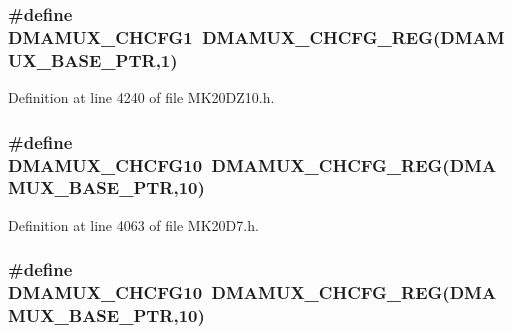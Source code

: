 \subsubsection[{\texorpdfstring{D\+M\+A\+M\+U\+X\+\_\+\+C\+H\+C\+F\+G1}{DMAMUX_CHCFG1}}]{\setlength{\rightskip}{0pt plus 5cm}\#define D\+M\+A\+M\+U\+X\+\_\+\+C\+H\+C\+F\+G1~{\bf D\+M\+A\+M\+U\+X\+\_\+\+C\+H\+C\+F\+G\+\_\+\+R\+EG}({\bf D\+M\+A\+M\+U\+X\+\_\+\+B\+A\+S\+E\+\_\+\+P\+TR},1)}\hypertarget{group___d_m_a_m_u_x___register___accessor___macros_gade1efccfbb28dfd338600665129d4b99}{}\label{group___d_m_a_m_u_x___register___accessor___macros_gade1efccfbb28dfd338600665129d4b99}


Definition at line 4240 of file M\+K20\+D\+Z10.\+h.

\subsubsection[{\texorpdfstring{D\+M\+A\+M\+U\+X\+\_\+\+C\+H\+C\+F\+G10}{DMAMUX_CHCFG10}}]{\setlength{\rightskip}{0pt plus 5cm}\#define D\+M\+A\+M\+U\+X\+\_\+\+C\+H\+C\+F\+G10~{\bf D\+M\+A\+M\+U\+X\+\_\+\+C\+H\+C\+F\+G\+\_\+\+R\+EG}({\bf D\+M\+A\+M\+U\+X\+\_\+\+B\+A\+S\+E\+\_\+\+P\+TR},10)}\hypertarget{group___d_m_a_m_u_x___register___accessor___macros_ga8cd0b61f68d8a523c35ebf55cdf1450c}{}\label{group___d_m_a_m_u_x___register___accessor___macros_ga8cd0b61f68d8a523c35ebf55cdf1450c}


Definition at line 4063 of file M\+K20\+D7.\+h.

\subsubsection[{\texorpdfstring{D\+M\+A\+M\+U\+X\+\_\+\+C\+H\+C\+F\+G10}{DMAMUX_CHCFG10}}]{\setlength{\rightskip}{0pt plus 5cm}\#define D\+M\+A\+M\+U\+X\+\_\+\+C\+H\+C\+F\+G10~{\bf D\+M\+A\+M\+U\+X\+\_\+\+C\+H\+C\+F\+G\+\_\+\+R\+EG}({\bf D\+M\+A\+M\+U\+X\+\_\+\+B\+A\+S\+E\+\_\+\+P\+TR},10)}\hypertarget{group___d_m_a_m_u_x___register___accessor___macros_ga8cd0b61f68d8a523c35ebf55cdf1450c}{}\label{group___d_m_a_m_u_x___register___accessor___macros_ga8cd0b61f68d8a523c35ebf55cdf1450c}



